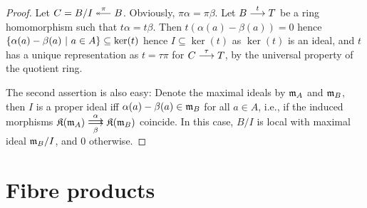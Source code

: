 \documentclass[a4paper,parskip=half,numbers=enddot, DIV=12]{scrreprt}
\begin{document}
	\begin{proof}
        Let $C = B/I \lepimorphism[\pi] B$. Obviously, $\pi \alpha = \pi\beta$. Let $B\morphism[t] T$ be a ring homomorphism such that $t\alpha = t\beta$. Then $t(\alpha(a)-\beta(a)) = 0$ hence $\left\{\alpha(a)-\beta(a)\ \middle|\  a\in A\right\} \subseteq \ker(t)$ hence $I\subseteq \ker(t)$ as $\ker(t)$ is an ideal, and $t$ has a unique representation as $t=\tau\pi$ for $C\morphism[\tau] T$, by the universal property of the quotient ring.
        
        The second assertion is also easy: Denote the maximal ideals by $\mathfrak{m}_A$ and $\mathfrak{m}_B$, then $I$ is a proper ideal iff $\alpha(a)-\beta(a)\in\mathfrak{m}_B$ for all $a\in A$, i.e., if the induced morphisms $\KK(\mm_A)\doublemorphism[\alpha][\smash{\beta}]\KK(\mm_B)$ coincide. In this case, $B/I$ is local with maximal ideal $\mathfrak{m}_B/I$, and $0$ otherwise.
	\end{proof}
	

\section{Fibre products}
\end{document}
